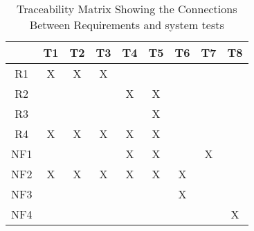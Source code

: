 \documentclass[12pt, titlepage]{article}
\begin{document}
\begin{table}[h!]
\centering
\begin{tabular}{|c|c|c|c|c|c|c|c|c|}
\hline
	& T1 & T2 & T3 & T4 & T5 & T6 & T7 &T8  \\
\hline
R1  & X&X & X& & & & &  \\ \hline
R2  & & & &X & X& & &   \\ \hline
R3  & & & & & X& & &   \\ \hline
R4  &X & X& X& X&X & & &  \\ \hline
NF1 & & & &X & X& & X&   \\ \hline
NF2   & X& X& X&X & X& X& &  \\ \hline
NF3   & & & & & & X& &  \\ \hline
NF4   & & & & & & & &X  \\ \hline
\hline
\end{tabular}
\caption{Traceability Matrix Showing the Connections Between Requirements and system tests}
\label{tab:reqtrace}
\end{table}
\end{document}
